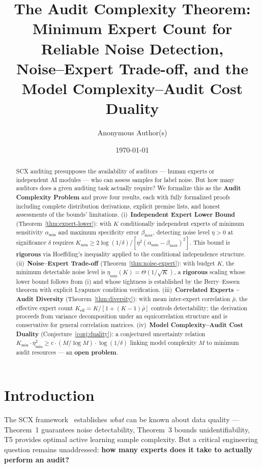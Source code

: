 \documentclass[12pt,a4paper]{article}
\title{\bfseries The Audit Complexity Theorem:\\
Minimum Expert Count for Reliable Noise Detection,\\
Noise--Expert Trade-off, and the\\
Model Complexity--Audit Cost Duality}
\author{Anonymous Author(s)}
\date{\today}
\newcommand{\etamin}{\eta_{\min}}
\newcommand{\rhobar}{\bar{\rho}}
\begin{document}
\maketitle

\begin{abstract}
SCX auditing presupposes the availability of auditors --- human experts or
independent AI modules --- who can assess samples for label noise.  But how many
auditors does a given auditing task actually require?  We formalize this as the
\textbf{Audit Complexity Problem} and prove four results, each with fully
formalized proofs including complete distribution derivations, explicit premise
lists, and honest assessments of the bounds' limitations.
(i)~\textbf{Independent Expert Lower Bound} (Theorem~\ref{thm:expert-lower}):
with $K$ conditionally independent experts of minimum sensitivity
$\alpha_{\min}$ and maximum specificity error $\beta_{\max}$, detecting noise
level $\eta>0$ at significance $\delta$ requires
$K_{\min}\geq 2\log(1/\delta)/[\eta^{2}(\alpha_{\min}-\beta_{\max})^{2}]$.
This bound is \textbf{rigorous} via Hoeffding's inequality applied to the
conditional independence structure.
(ii)~\textbf{Noise--Expert Trade-off} (Theorem~\ref{thm:noise-expert}):
with budget $K$, the minimum detectable noise level is
$\etamin(K)=\Theta(1/\sqrt{K})$, a \textbf{rigorous} scaling whose lower bound
follows from (i) and whose tightness is established by the Berry--Esseen theorem
with explicit Lyapunov condition verification.
(iii)~\textbf{Correlated Experts -- Audit Diversity}
(Theorem~\ref{thm:diversity}): with mean inter-expert correlation $\rhobar$,
the effective expert count $K_{\mathrm{eff}}=K/[1+(K-1)\rhobar]$ controls
detectability; the derivation proceeds from variance decomposition under an
equicorrelation structure and is conservative for general correlation matrices.
(iv)~\textbf{Model Complexity--Audit Cost Duality}
(Conjecture~\ref{conj:duality}): a conjectured uncertainty relation
$K_{\min}\cdot\etamin^{2}\geq c\cdot(M/\log M)\cdot\log(1/\delta)$ linking
model complexity $M$ to minimum audit resources --- an \textbf{open problem}.
\end{abstract}

\section{Introduction}

The SCX framework~\citep{scx2024cercis} establishes \emph{what} can be known
about data quality --- Theorem~1 guarantees noise detectability, Theorem~3 bounds
unidentifiability, T5 provides optimal active learning sample complexity.  But
a critical engineering question remains unaddressed: \textbf{how many experts
does it take to actually perform an audit?}
\end{document}
